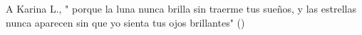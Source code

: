 \begin{dedication}
	
A Karina L., " porque la luna nunca brilla sin traerme tus sueños, y las estrellas nunca aparecen sin que yo sienta tus ojos brillantes" (\citeauthor*{poe_annabel_2014}) \\
\bigskip

\end{dedication}
